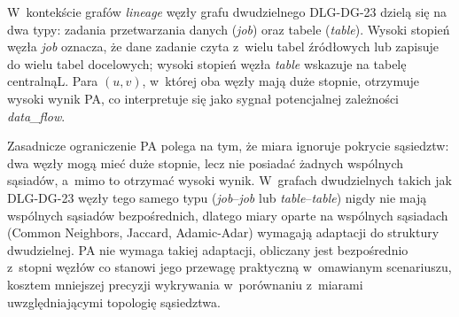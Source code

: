 \documentclass[polish,master,a4paper,oneside]{ppfcmthesis}
\begin{document}
W~kontekście grafów \textit{lineage} węzły grafu dwudzielnego DLG-DG-23 dzielą
się na dwa typy: zadania przetwarzania danych (\textit{job}) oraz tabele
(\textit{table}). Wysoki stopień węzła \textit{job} oznacza, że dane zadanie
czyta z~wielu tabel źródłowych lub zapisuje do wielu tabel docelowych;
wysoki stopień węzła \textit{table} wskazuje na tabelę centralnąL. Para $(u, v)$, w~której oba
węzły mają duże stopnie, otrzymuje wysoki wynik PA, co interpretuje się jako
sygnał potencjalnej zależności \textit{data\_flow}.

Zasadnicze ograniczenie PA polega na tym, że miara ignoruje pokrycie sąsiedztw:
dwa węzły mogą mieć duże stopnie, lecz nie posiadać żadnych wspólnych sąsiadów,
a~mimo to otrzymać wysoki wynik. W~grafach dwudzielnych takich jak DLG-DG-23
węzły tego samego typu (\textit{job}–\textit{job} lub
\textit{table}–\textit{table}) nigdy nie mają wspólnych sąsiadów bezpośrednich,
dlatego miary oparte na wspólnych sąsiadach (Common Neighbors, Jaccard,
Adamic-Adar) wymagają adaptacji do struktury dwudzielnej. PA nie wymaga takiej
adaptacji,  obliczany jest bezpośrednio z~stopni węzłów co stanowi jego
przewagę praktyczną w~omawianym scenariuszu, kosztem mniejszej precyzji
wykrywania w~porównaniu z~miarami uwzględniającymi topologię sąsiedztwa.

%
%
%
%
%
%
\end{document}
